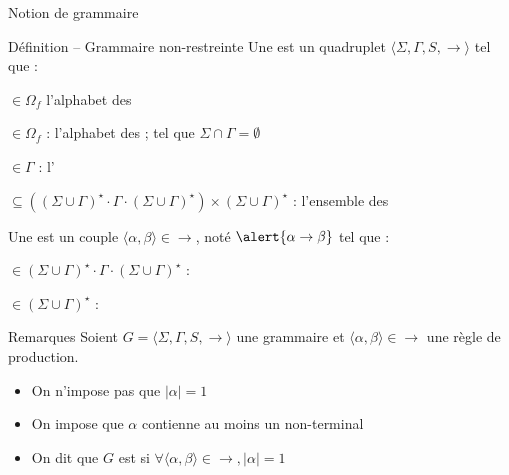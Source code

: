 
\begingroup

\begin{frame}{Notion de grammaire}
  
  \begin{block}{Définition -- Grammaire non-restreinte}
    Une  est un quadruplet \alert{$\langle \Sigma, \Gamma, S, \rightarrow \rangle$} tel que :
    \begin{description}[xxxx]
    \item[\alert{$\Sigma$}] $\in \Omega_f$ l'alphabet des 
    \item[\alert{$\Gamma$}] $\in \Omega_f$ : l'alphabet des ; tel que $\Sigma \cap \Gamma = \emptyset$
    \item[\alert{$S$}] $\in \Gamma$ : l'
    \item[\alert{$\rightarrow$}] $\subseteq ((\Sigma \cup \Gamma)^\star \cdot \Gamma \cdot (\Sigma \cup \Gamma)^\star) \times (\Sigma \cup \Gamma)^\star$ : l'ensemble des 
    \end{description}

    \vspace{1mm}
    Une  est un couple \alert{$\langle \alpha, \beta \rangle \in \rightarrow$}, noté $\alert{\alpha \rightarrow \beta}$ tel que :
    \begin{description}[xxxx]
    \item[\alert{$\alpha$}] $\in (\Sigma \cup \Gamma)^\star \cdot \Gamma \cdot (\Sigma \cup \Gamma)^\star$ : 
    \item[\alert{$\beta$}] $\in (\Sigma \cup \Gamma)^\star$ : 
    \end{description}
  \end{block}

  \begin{block}{Remarques}
    Soient $G = \langle \Sigma, \Gamma, S, \rightarrow \rangle$ une grammaire et $\langle \alpha, \beta \rangle \in \rightarrow$ une règle de production. 
    \begin{itemize}
    \item On n'impose pas que $|\alpha| = 1$ 
    \item On impose que $\alpha$ contienne au moins un non-terminal 
    \item On dit que $G$ est  si $\forall \langle \alpha, \beta \rangle \in \rightarrow, |\alpha| = 1$
    \end{itemize}
  \end{block}

\end{frame}

\endgroup
\endinput
